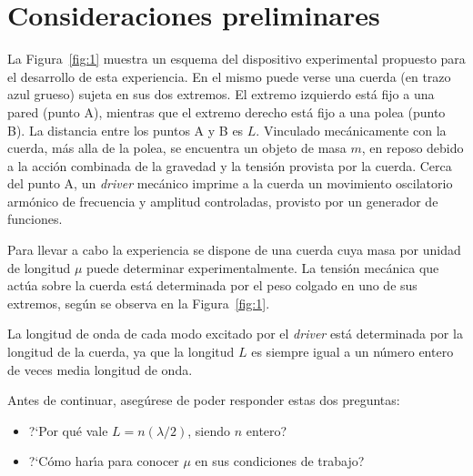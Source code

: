 \documentclass[laboratorio]{guia}
\begin{document}
 
\maketitle

\section{Consideraciones preliminares}

La Figura~\ref{fig:1} muestra un esquema del dispositivo experimental propuesto
para el desarrollo de esta experiencia. En el mismo puede verse una cuerda (en
trazo azul grueso) sujeta en sus dos extremos. El extremo izquierdo est\'a fijo
a una pared (punto A), mientras que el extremo derecho est\'a fijo a una polea
(punto B). La distancia entre los puntos A y B es $L$. Vinculado 
mec\'anicamente con la cuerda, m\'as alla de la polea, se
encuentra un objeto de masa $m$, en reposo debido a la acci\'on combinada de la
gravedad y la tensi\'on provista por la cuerda. Cerca del punto A, un {\it
driver} mec\'anico imprime a la cuerda un movimiento oscilatorio arm\'onico de
frecuencia y amplitud controladas, provisto por un generador de funciones.

Para llevar a cabo la experiencia se dispone de una cuerda cuya masa por unidad de longitud $\mu$ puede
determinar experimentalmente. La tensi\'on mec\'anica que act\'ua
sobre la cuerda est\'a determinada por el peso colgado en uno de sus extremos,
seg\'un se observa en la Figura~\ref{fig:1}. 

La longitud de onda de cada modo excitado por el {\it driver} est\'a
determinada por la longitud de la cuerda, ya que la longitud $L$ es siempre
igual a un n\'umero entero de veces media longitud de onda.

Antes de continuar, aseg\'urese de poder responder estas dos preguntas:
\begin{itemize}
    \item ?`Por qu\'e vale $L = n (\lambda/2)$, siendo $n$ entero? 
    \item ?`C\'omo har\'\i a para conocer $\mu$ en sus condiciones de trabajo?
\end{itemize}
\end{document}

